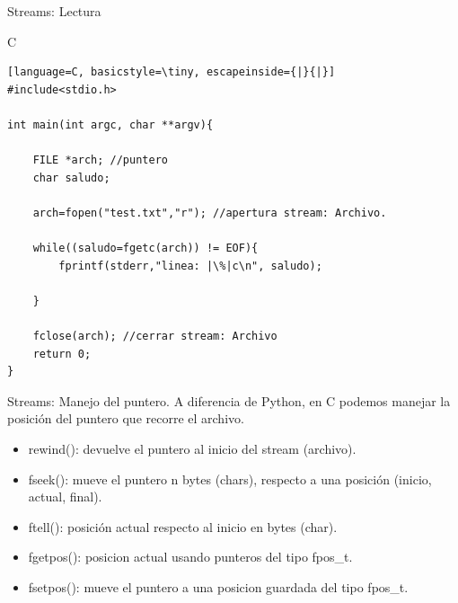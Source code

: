 \documentclass{beamer}
\begin{document}
\begin{frame}[fragile]{Streams: Lectura}
\begin{exampleblock}{C}
\begin{lstlisting}[language=C, basicstyle=\tiny, escapeinside={|}{|}]
#include<stdio.h>

int main(int argc, char **argv){

	FILE *arch; //puntero
	char saludo;

	arch=fopen("test.txt","r"); //apertura stream: Archivo.

	while((saludo=fgetc(arch)) != EOF){
		fprintf(stderr,"linea: |\%|c\n", saludo);

	}

	fclose(arch); //cerrar stream: Archivo
	return 0;
}
\end{lstlisting}
\end{exampleblock}
\end{frame}

\begin{frame}[fragile]{Streams: Manejo del puntero.}
A diferencia de Python, en C podemos manejar la posición del puntero que recorre el archivo.
\begin{itemize}
	\item rewind(): devuelve el puntero al inicio del stream (archivo).
	\item fseek(): mueve el puntero n bytes (chars), respecto a una posición (inicio, actual, final). 
	\item ftell(): posición actual respecto al inicio en bytes (char).
	\item fgetpos(): posicion actual usando punteros del tipo fpos\_t.
	\item fsetpos(): mueve el puntero a una posicion guardada del tipo fpos\_t.
	\end{itemize}
\end{frame}
\end{document}
